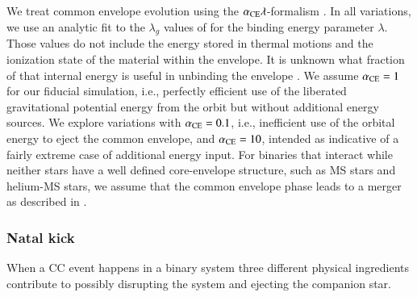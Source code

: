 \documentclass{aa}
\begin{document}
We treat common envelope evolution using the $\alpha_{\rm CE}
\lambda$-formalism \citep[][]{webbink:84, livio:88, dekool:90, hurley:02}. In all
variations, we use an analytic fit to the $\lambda_{g}$ values of
\cite{dewi:00} for the binding energy parameter $\lambda$. Those values do not include the energy stored in thermal
motions and the ionization state of the material within the
envelope. It is unknown what fraction of that internal energy is
useful in unbinding the envelope \citep[see, e.g.,][and references
therein]{dewi:00, ivanova:13}.  We assume $\alpha_{\rm CE} = 1$ for
our fiducial simulation, i.e., perfectly efficient use of the
liberated gravitational potential energy from the orbit but without
additional energy sources.  We explore variations with  $\alpha_{\rm
  CE} = 0.1$, i.e., inefficient use of the orbital energy to eject the
common envelope, and $\alpha_{\rm CE} = 10$, intended as indicative of
a fairly extreme case of additional energy input. For
binaries that interact while neither stars have a well defined core-envelope structure, such as
MS stars and helium-MS stars, we assume that the common envelope
phase leads to a merger as described in \cite{demink:13, schneider:15}.

\subsubsection{Natal kick}
\label{sec:SN_kick}

When a CC event happens in a binary system three different physical
ingredients contribute to possibly disrupting the system and ejecting the
companion star.
\end{document}
